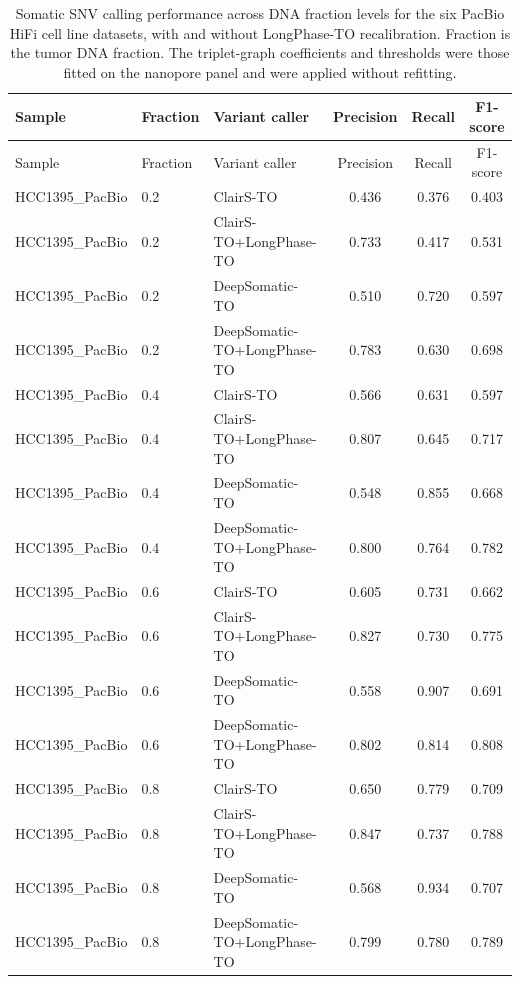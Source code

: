 \documentclass[pdflatex,sn-nature]{sn-jnl}
\begin{document}
{\small
\begin{longtable}{@{}lllccc@{}}
  \caption[Somatic SNV calling performance on the PacBio HiFi panel]%
  {Somatic SNV calling performance across DNA fraction levels for the six PacBio HiFi
  cell line datasets, with and without LongPhase-TO recalibration. Fraction is the tumor
  DNA fraction. The triplet-graph coefficients and thresholds were those fitted on the
  nanopore panel and were applied without refitting.}
  \label{tab:pacbio_somatic_snv}\\
  \toprule
  Sample & Fraction & Variant caller & Precision & Recall & F1-score \\
  \midrule
  \endfirsthead
  \toprule
  Sample & Fraction & Variant caller & Precision & Recall & F1-score \\
  \midrule
  \endhead
  \bottomrule
  \endlastfoot
  HCC1395\_PacBio & 0.2 & ClairS-TO & 0.436 & 0.376 & 0.403 \\
  HCC1395\_PacBio & 0.2 & ClairS-TO+LongPhase-TO & 0.733 & 0.417 & 0.531 \\
  HCC1395\_PacBio & 0.2 & DeepSomatic-TO & 0.510 & 0.720 & 0.597 \\
  HCC1395\_PacBio & 0.2 & DeepSomatic-TO+LongPhase-TO & 0.783 & 0.630 & 0.698 \\
  HCC1395\_PacBio & 0.4 & ClairS-TO & 0.566 & 0.631 & 0.597 \\
  HCC1395\_PacBio & 0.4 & ClairS-TO+LongPhase-TO & 0.807 & 0.645 & 0.717 \\
  HCC1395\_PacBio & 0.4 & DeepSomatic-TO & 0.548 & 0.855 & 0.668 \\
  HCC1395\_PacBio & 0.4 & DeepSomatic-TO+LongPhase-TO & 0.800 & 0.764 & 0.782 \\
  HCC1395\_PacBio & 0.6 & ClairS-TO & 0.605 & 0.731 & 0.662 \\
  HCC1395\_PacBio & 0.6 & ClairS-TO+LongPhase-TO & 0.827 & 0.730 & 0.775 \\
  HCC1395\_PacBio & 0.6 & DeepSomatic-TO & 0.558 & 0.907 & 0.691 \\
  HCC1395\_PacBio & 0.6 & DeepSomatic-TO+LongPhase-TO & 0.802 & 0.814 & 0.808 \\
  HCC1395\_PacBio & 0.8 & ClairS-TO & 0.650 & 0.779 & 0.709 \\
  HCC1395\_PacBio & 0.8 & ClairS-TO+LongPhase-TO & 0.847 & 0.737 & 0.788 \\
  HCC1395\_PacBio & 0.8 & DeepSomatic-TO & 0.568 & 0.934 & 0.707 \\
  HCC1395\_PacBio & 0.8 & DeepSomatic-TO+LongPhase-TO & 0.799 & 0.780 & 0.789 \\

\end{longtable}}
\end{document}
